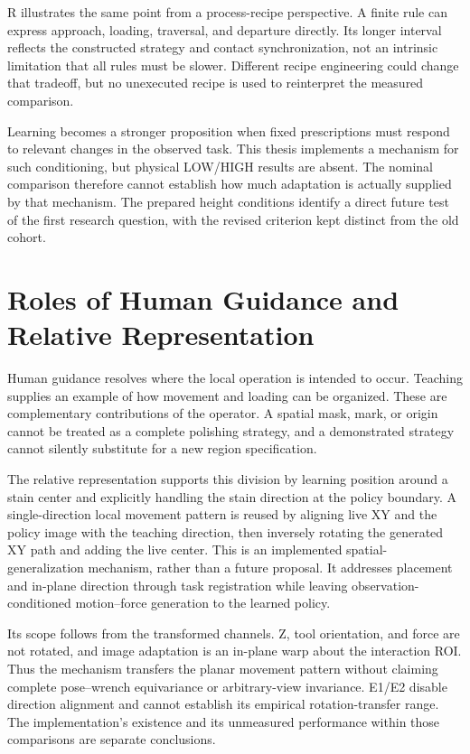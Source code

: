 R illustrates the same point from a process-recipe perspective. A finite rule can express approach, loading, traversal, and departure directly. Its longer interval reflects the constructed strategy and contact synchronization, not an intrinsic limitation that all rules must be slower. Different recipe engineering could change that tradeoff, but no unexecuted recipe is used to reinterpret the measured comparison.

Learning becomes a stronger proposition when fixed prescriptions must respond to relevant changes in the observed task. This thesis implements a mechanism for such conditioning, but physical LOW/HIGH results are absent. The nominal comparison therefore cannot establish how much adaptation is actually supplied by that mechanism. The prepared height conditions identify a direct future test of the first research question, with the revised criterion kept distinct from the old cohort.

\section{Roles of Human Guidance and Relative Representation}
Human guidance resolves where the local operation is intended to occur. Teaching supplies an example of how movement and loading can be organized. These are complementary contributions of the operator. A spatial mask, mark, or origin cannot be treated as a complete polishing strategy, and a demonstrated strategy cannot silently substitute for a new region specification.

The relative representation supports this division by learning position around a stain center and explicitly handling the stain direction at the policy boundary. A single-direction local movement pattern is reused by aligning live XY and the policy image with the teaching direction, then inversely rotating the generated XY path and adding the live center. This is an implemented spatial-generalization mechanism, rather than a future proposal. It addresses placement and in-plane direction through task registration while leaving observation-conditioned motion--force generation to the learned policy.

Its scope follows from the transformed channels. Z, tool orientation, and force are not rotated, and image adaptation is an in-plane warp about the interaction ROI. Thus the mechanism transfers the planar movement pattern without claiming complete pose--wrench equivariance or arbitrary-view invariance. E1/E2 disable direction alignment and cannot establish its empirical rotation-transfer range. The implementation's existence and its unmeasured performance within those comparisons are separate conclusions.

